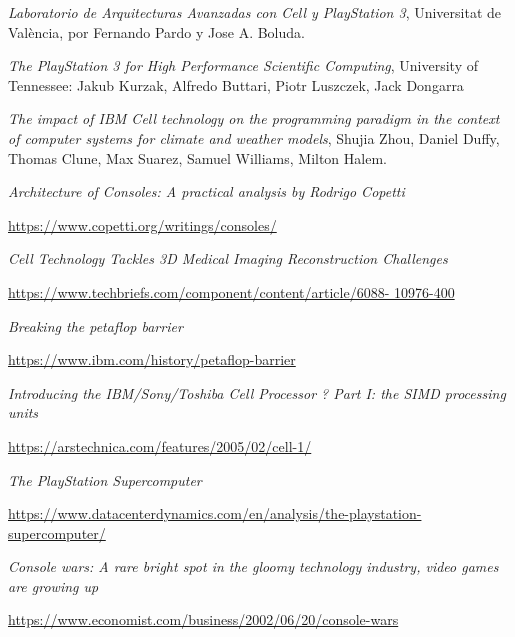 \documentclass[10pt,compsoc]{IEEEtran}
\begin{document}
	\begin{thebibliography}{1}
	
			{\it{Laboratorio de Arquitecturas Avanzadas con Cell y PlayStation 3}}, Universitat de València, por Fernando Pardo y Jose A. Boluda.\newline
			
			{\it{The PlayStation 3 for High Performance Scientific Computing}}, University of Tennessee: Jakub Kurzak, Alfredo Buttari, Piotr Luszczek, Jack Dongarra\newline
			
			{\it{The impact of IBM Cell technology on the programming paradigm in the context of computer systems	for climate and weather	models}}, Shujia Zhou, Daniel Duffy, Thomas Clune, Max Suarez, 	Samuel Williams, Milton Halem.\newline
			
			{\it{Architecture of Consoles: A practical analysis by Rodrigo Copetti}}
			
			\url{https://www.copetti.org/writings/consoles/}\newline
			
			{\it{Cell Technology Tackles 3D Medical Imaging Reconstruction Challenges}}
			
			\url{https://www.techbriefs.com/component/content/article/6088-
				10976-400}\newline
			
			{\it{Breaking the petaflop barrier}}
			
			\url{https://www.ibm.com/history/petaflop-barrier}\newline
			
			{\it{Introducing the IBM/Sony/Toshiba Cell Processor ? Part I: the SIMD processing units}}
			
			\url{https://arstechnica.com/features/2005/02/cell-1/}\newline
			
			{\it{The PlayStation Supercomputer}}
			
			\url{https://www.datacenterdynamics.com/en/analysis/the-playstation-supercomputer/}\newline
	
			{\it{Console wars: A rare bright spot in the gloomy technology industry, video games are growing up}}
			 
			\url{https://www.economist.com/business/2002/06/20/console-wars}\newline
			


\end{thebibliography}
\end{document}
